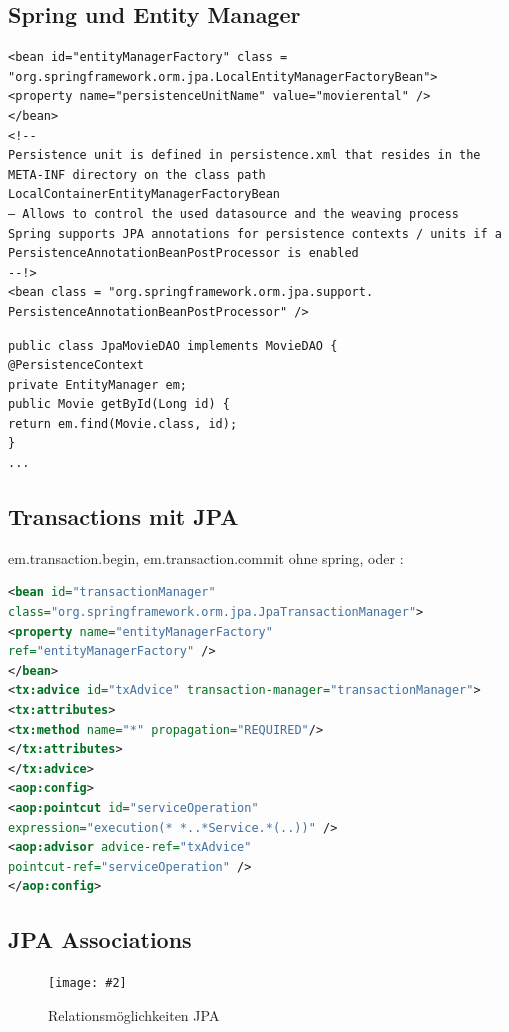 \documentclass[a4paper,10pt]{scrreprt}
\newcommand{\pic}[2][figure]{\begin{figure}[h]
 \centering
 \texttt{[image: \#2]}
 \caption{#1}
\end{figure}
}
\begin{document}
\subsection{Spring und Entity Manager }
\begin{lstlisting}[caption= Spring und JPA]
  <bean id="entityManagerFactory" class =
"org.springframework.orm.jpa.LocalEntityManagerFactoryBean">
<property name="persistenceUnitName" value="movierental" />
</bean>
<!--
Persistence unit is defined in persistence.xml that resides in the
META-INF directory on the class path
LocalContainerEntityManagerFactoryBean
– Allows to control the used datasource and the weaving process
Spring supports JPA annotations for persistence contexts / units if a
PersistenceAnnotationBeanPostProcessor is enabled
--!>
<bean class = "org.springframework.orm.jpa.support.
PersistenceAnnotationBeanPostProcessor" />

\end{lstlisting}
\begin{lstlisting}[caption=Spring Injected DAO JPA]
 public class JpaMovieDAO implements MovieDAO {
@PersistenceContext
private EntityManager em;
public Movie getById(Long id) {
return em.find(Movie.class, id);
}
...
\end{lstlisting}

\subsection{Transactions mit JPA}
em.transaction.begin, em.transaction.commit ohne spring, oder :
\begin{lstlisting}[caption=Spring Transactions AOP JPA,language=xml]
 <bean id="transactionManager"
class="org.springframework.orm.jpa.JpaTransactionManager">
<property name="entityManagerFactory"
ref="entityManagerFactory" />
</bean>
<tx:advice id="txAdvice" transaction-manager="transactionManager">
<tx:attributes>
<tx:method name="*" propagation="REQUIRED"/>
</tx:attributes>
</tx:advice>
<aop:config>
<aop:pointcut id="serviceOperation"
expression="execution(* *..*Service.*(..))" />
<aop:advisor advice-ref="txAdvice"
pointcut-ref="serviceOperation" />
</aop:config>
\end{lstlisting}

\subsection{JPA Associations}
\pic[Relationsmöglichkeiten JPA]{relations.png}
\end{document}

